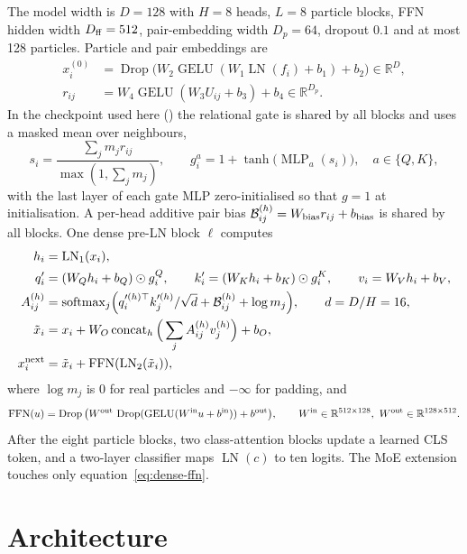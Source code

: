 \documentclass[11pt,a4paper]{article}
\newcommand{\code}[1]{\texttt{\detokenize{#1}}}
\newcommand{\R}{\mathbb R}
\newcommand{\softmax}{\operatorname{softmax}}
\newcommand{\LN}{\operatorname{LN}}
\newcommand{\GELU}{\operatorname{GELU}}
\newcommand{\FFN}{\operatorname{FFN}}
\newcommand{\Drop}{\operatorname{Drop}}
\newcommand{\MLP}{\operatorname{MLP}}
\newcommand{\Had}{\odot}
\begin{document}
The model width is $D=128$ with $H=8$ heads, $L=8$ particle blocks, FFN hidden width
$D_{\rm ff}=512$, pair-embedding width $D_p=64$, dropout $0.1$ and at most 128 particles.
Particle and pair embeddings are
\begin{align}
 x_i^{(0)}&=\Drop\big(W_2\GELU(W_1\LN(f_i)+b_1)+b_2\big)\in\R^{D},\\
 r_{ij}&=W_4\GELU(W_3U_{ij}+b_3)+b_4\in\R^{D_p}.
\end{align}
In the checkpoint used here (\code{v2_shared}) the relational gate is shared by all blocks
and uses a masked mean over neighbours,
\begin{equation}
 s_i=\frac{\sum_j m_j r_{ij}}{\max(1,\sum_j m_j)},\qquad
 g_i^{a}=1+\tanh\!\big(\MLP_a(s_i)\big),\quad a\in\{Q,K\},
\end{equation}
with the last layer of each gate MLP zero-initialised so that $g=1$ at initialisation. A
per-head additive pair bias $\mathcal B_{ij}^{(h)}=W_{\rm bias}r_{ij}+b_{\rm bias}$ is shared by
all blocks. One dense pre-LN block $\ell$ computes
\begin{align}
 h_i&=\LN_1(x_i),\\
 q'_i&=(W_Qh_i+b_Q)\Had g_i^Q,\qquad k'_i=(W_Kh_i+b_K)\Had g_i^K,\qquad v_i=W_Vh_i+b_V,\\
 A^{(h)}_{ij}&=\softmax_j\!\Big(q_i'^{(h)\top}k_j'^{(h)}/\sqrt{d}+\mathcal B^{(h)}_{ij}
   +\log m_j\Big),\qquad d=D/H=16,\\
 \tilde x_i&=x_i+W_O\operatorname{concat}_h\Big(\sum_jA^{(h)}_{ij}v_j^{(h)}\Big)+b_O,\\
 x_i^{\rm next}&=\tilde x_i+\FFN(\LN_2(\tilde x_i)),
 \label{eq:dense-ffn}
\end{align}
where $\log m_j$ is $0$ for real particles and $-\infty$ for padding, and
\begin{equation}
 \FFN(u)=\Drop\big(W^{\rm out}\,\Drop(\GELU(W^{\rm in}u+b^{\rm in}))+b^{\rm out}\big),
 \qquad W^{\rm in}\in\R^{512\times128},\ W^{\rm out}\in\R^{128\times512}.
\end{equation}
After the eight particle blocks, two class-attention blocks update a learned CLS token, and
a two-layer classifier maps $\LN(c)$ to ten logits. The MoE extension touches only
equation~\eqref{eq:dense-ffn}.

\section{Architecture}
\end{document}
